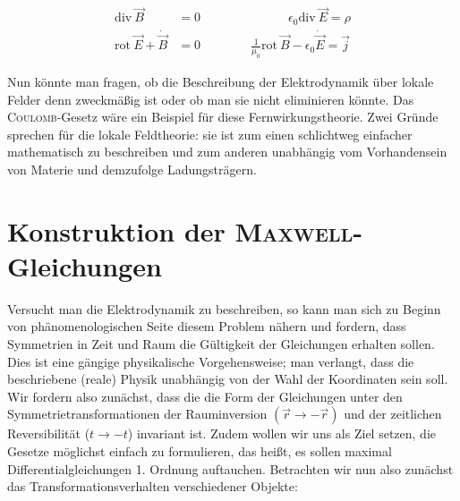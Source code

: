 \begin{align*}
\text{div} \ \vec{B} &= 0 \qquad\qquad\qquad\quad \epsilon_0\text{div} \ \vec{E} = \rho \\
\text{rot} \ \vec{E} + \dot{\vec{B}} &= 0 \qquad\qquad \frac{1}{\mu_0}\text{rot} \ \vec{B} - \epsilon_0\dot{\vec{E}} = \vec{j}
\end{align*}


Nun könnte man fragen, ob die  Beschreibung der Elektrodynamik über lokale Felder denn zweckmäßig ist oder ob man sie nicht eliminieren könnte. Das \textsc{Coulomb}-Gesetz wäre ein Beispiel für diese Fernwirkungstheorie. Zwei Gründe sprechen für die lokale Feldtheorie: sie ist zum einen schlichtweg einfacher mathematisch zu beschreiben und zum anderen unabhängig vom Vorhandensein von Materie und demzufolge Ladungsträgern.

\section{Konstruktion der \textsc{Maxwell}-Gleichungen}
Versucht man die Elektrodynamik zu beschreiben, so kann man sich zu Beginn von phänomenologischen Seite diesem Problem nähern und fordern, dass Symmetrien in Zeit und Raum die Gültigkeit der Gleichungen erhalten sollen. Dies ist eine gängige physikalische Vorgehensweise; man verlangt, dass die beschriebene (reale) Physik unabhängig von der Wahl der Koordinaten sein soll.
Wir fordern also zunächst, dass die die Form der Gleichungen unter den Symmetrietransformationen der Rauminversion $(\vec{r}\rightarrow-\vec{r})$ und der zeitlichen Reversibilität ($t\rightarrow-t$) invariant ist. Zudem wollen wir uns als Ziel setzen, die Gesetze möglichst einfach zu formulieren, das heißt, es sollen maximal Differentialgleichungen 1. Ordnung auftauchen.
Betrachten wir nun also zunächst das Transformationsverhalten verschiedener Objekte:\ \\
\ \\


